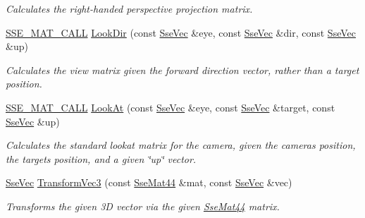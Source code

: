 \begin{DoxyCompactItemize}
\begin{DoxyCompactList}\small\item\em Calculates the right-\/handed perspective projection matrix. \end{DoxyCompactList}\item 
\hyperlink{ssemat__math__defs_8h_a741f88d5589197d03fea9ab2b7622b8a}{S\+S\+E\+\_\+\+M\+A\+T\+\_\+\+C\+A\+L\+L} \hyperlink{namespacegfxmath_a67dc21f3890ac0ef9a36b05b71ad36db}{Look\+Dir} (const \hyperlink{namespacegfxmath_a0de2243e2b8d0fd46d3af5e036423004}{Sse\+Vec} \&eye, const \hyperlink{namespacegfxmath_a0de2243e2b8d0fd46d3af5e036423004}{Sse\+Vec} \&dir, const \hyperlink{namespacegfxmath_a0de2243e2b8d0fd46d3af5e036423004}{Sse\+Vec} \&up)
\begin{DoxyCompactList}\small\item\em Calculates the view matrix given the forward direction vector, rather than a target position. \end{DoxyCompactList}\item 
\hyperlink{ssemat__math__defs_8h_a741f88d5589197d03fea9ab2b7622b8a}{S\+S\+E\+\_\+\+M\+A\+T\+\_\+\+C\+A\+L\+L} \hyperlink{namespacegfxmath_abc7554e34178f4e36a906a12ea469c64}{Look\+At} (const \hyperlink{namespacegfxmath_a0de2243e2b8d0fd46d3af5e036423004}{Sse\+Vec} \&eye, const \hyperlink{namespacegfxmath_a0de2243e2b8d0fd46d3af5e036423004}{Sse\+Vec} \&target, const \hyperlink{namespacegfxmath_a0de2243e2b8d0fd46d3af5e036423004}{Sse\+Vec} \&up)
\begin{DoxyCompactList}\small\item\em Calculates the standard lookat matrix for the camera, given the camera\textquotesingle{}s position, the target\textquotesingle{}s position, and a given \char`\"{}up\char`\"{} vector. \end{DoxyCompactList}\item 
\hyperlink{namespacegfxmath_a0de2243e2b8d0fd46d3af5e036423004}{Sse\+Vec} \hyperlink{namespacegfxmath_a7f0f017f89ae1ba6cf642fba6ce8e4cd}{Transform\+Vec3} (const \hyperlink{classgfxmath_1_1_sse_mat44}{Sse\+Mat44} \&mat, const \hyperlink{namespacegfxmath_a0de2243e2b8d0fd46d3af5e036423004}{Sse\+Vec} \&vec)
\begin{DoxyCompactList}\small\item\em Transforms the given 3\+D vector via the given \hyperlink{classgfxmath_1_1_sse_mat44}{Sse\+Mat44} matrix. \end{DoxyCompactList}\end{DoxyCompactItemize}

